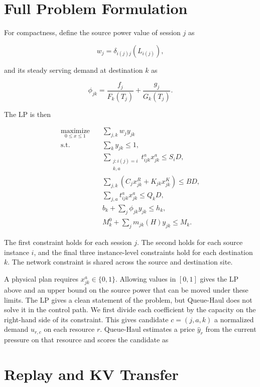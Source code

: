 \section{Full Problem Formulation}

For compactness, define the source power value of session \(j\) as

\[
w_j
=
\delta_{i(j)j}\!\left(L_{i(j)}\right),
\]

and its steady serving demand at destination \(k\) as

\[
\phi_{jk}
=
\frac{f_j}{F_k(T_j)}
+
\frac{g_j}{G_k(T_j)}.
\]

The LP is then

\[
\begin{aligned}
\underset{{0\le x\le1}}{\text{maximize}}\quad
& \sum_{j,k} w_j y_{jk}
\\
\mathrm{s.t.}\quad
& \sum_k y_{jk}\le1,
\\
& \sum_{\substack{j:i(j)=i\\k,a}}
  t_{ijk}^{a}x_{jk}^{a}
  \le S_iD,
\\
& \sum_{j,k}
  \left(
    C_jx_{jk}^{R}
    +K_{jk}x_{jk}^{K}
  \right)
  \le BD,
\\
& \sum_{j,a}
  t_{ijk}^{a}x_{jk}^{a}
  \le Q_kD,
\\
& b_k+\sum_j\phi_{jk}y_{jk}
  \le h_k,
\\
& M_k^{0}+\sum_jm_{jk}(H)y_{jk}
  \le M_k.
\end{aligned}
\]

The first constraint holds for each session \(j\). The second holds for
each source instance \(i\), and the final three instance-level
constraints hold for each destination \(k\). The network constraint is
shared across the source and destination site.

A physical plan requires \(x_{jk}^{a}\in\{0,1\}\). Allowing values in
\([0,1]\) gives the LP above and an upper bound on the source power that
can be moved under these limits.  The LP gives a clean statement of the problem, but Queue-Haul does not solve it in the control path. We first divide each coefficient by the capacity on the right-hand side of its constraint. This gives candidate \(c=(j,a,k)\) a normalized demand \(u_{r,c}\) on each resource \(r\). Queue-Haul estimates a price \(\hat y_r\) from the current pressure on that resource and scores the candidate as


\section{Replay and KV Transfer}
\label{app:migration-ratio}

